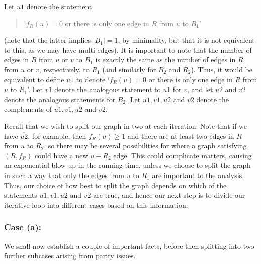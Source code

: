 \documentclass{article}
\newtheorem{Proof of Theorem}{Proof of Theorem}
\begin{document}
Let $u1$ denote the statement 
\begin{quote}
`$f_{R}(u)=0$ or there is only one edge in $B$ from $u$ to $B_{1}$' 
\end{quote}
(note that the latter implies $|B_{1}|=1$, by minimality,
but that it is not equivalent to this,
as we may have multi-edges).
It is important to note that the number of edges in $B$ from $u$ or $v$ to $B_{1}$
is exactly the same as the number of edges in $R$ from $u$ or $v$, respectively, to $R_{1}$
(and similarly for $B_{2}$ and $R_{2}$).
Thus, it would be equivalent to define $u1$ to denote
`$f_{R}(u)=0$ or there is only one edge in $R$ from $u$ to $R_{1}$'.
Let $v1$ denote the analogous statement to $u1$ for $v$,
and let $u2$ and $v2$ denote the analogous statements for $B_{2}$.
Let $\overline{u1},\overline{v1},\overline{u2}$ and $\overline{v2}$
denote the complements of $u1,v1,u2$ and $v2$. 

Recall that we wish to split our graph in two at each iteration.
Note that if we have $\overline{u2}$, for example,
then $f_{R}(u) \geq 1$
and there are at least two edges in $R$ from $u$ to $R_{2}$,
so there may be several possibilities for where a graph satisfying $(R,f_{R})$
could have a new $u-R_{2}$ edge.
This could complicate matters,
causing an exponential blow-up in the running time,
unless we choose to split the graph in such a way that only the edges from $u$ to $R_{1}$
are important to the analysis.
Thus,
our choice of how best to split the graph
depends on which of the statements $u1,v1,u2$ and $v2$ are true,
and hence our next step is to divide our iterative loop
into different cases based on this information.





\subsubsection*{Case (a): }
 




We shall now establish a couple of important facts,
before then splitting into two further subcases arising from parity issues.
\end{document}
